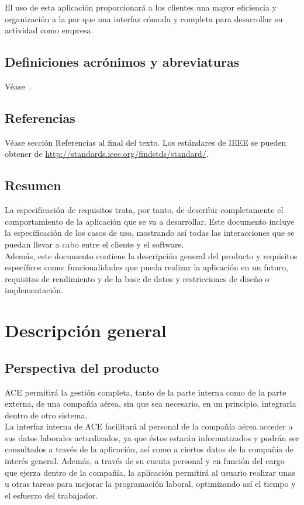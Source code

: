 \documentclass[11pt, a4paper, twoside, titlepage]{article}
\begin{document}
			El uso de esta aplicación proporcionará a los clientes una mayor eficiencia y organización a la par que una interfaz cómoda y completa para desarrollar su actividad como empresa. 
			
		\subsection{Definiciones acrónimos y abreviaturas}
			Véase~.
		\subsection{Referencias}
			Véase sección Referencias al final del texto. Los estándares de IEEE se pueden obtener de \url{http://standards.ieee.org/findstds/standard/}.
		\subsection{Resumen}
			La especificación de requisitos trata, por tanto, de describir completamente el comportamiento de la aplicación que se va a desarrollar. Este documento incluye la especificación de los casos de uso, mostrando así todas las interacciones que se puedan llevar a cabo entre el cliente y el software. \\

			Además, este documento contiene la descripción general del producto y requisitos específicos como: funcionalidades que pueda realizar la aplicación en un futuro, requisitos de rendimiento y de la base de datos y restricciones de diseño o implementación.
			
	\section{Descripción general}
		\subsection{Perspectiva del producto}
			ACE permitirá la gestión completa, tanto de la parte interna como de la parte externa, de una compañía aérea, sin que sea necesario, en un principio, integrarla dentro de otro sistema. \\
			
			La interfaz interna de ACE facilitará al personal de la compañía aérea acceder a sus datos laborales actualizados, ya que éstos estarán informatizados y podrán ser consultados a través de la aplicación, así como a ciertos datos de la compañía de interés general. Además, a través de su cuenta personal y en función del cargo que ejerza dentro de la compañía, la aplicación permitirá al usuario realizar unas u otras tareas para mejorar la programación laboral, optimizando así el tiempo y el esfuerzo del trabajador. \\
			
\end{document}
